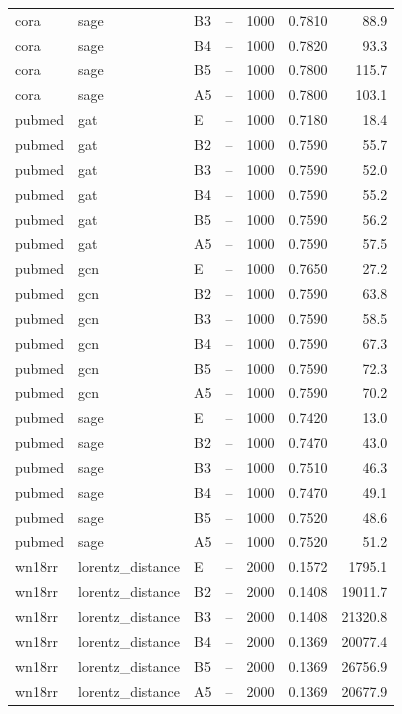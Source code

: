 \begin{longtable}{llllrrr}
cora & sage & B3 & -- & 1000 & 0.7810 & 88.9 \\
cora & sage & B4 & -- & 1000 & 0.7820 & 93.3 \\
\rowcolor{oursbg}
cora & sage & B5 & -- & 1000 & 0.7800 & 115.7 \\
cora & sage & A5 & -- & 1000 & 0.7800 & 103.1 \\
pubmed & gat & E & -- & 1000 & 0.7180 & 18.4 \\
pubmed & gat & B2 & -- & 1000 & 0.7590 & 55.7 \\
pubmed & gat & B3 & -- & 1000 & 0.7590 & 52.0 \\
pubmed & gat & B4 & -- & 1000 & 0.7590 & 55.2 \\
\rowcolor{oursbg}
pubmed & gat & B5 & -- & 1000 & 0.7590 & 56.2 \\
pubmed & gat & A5 & -- & 1000 & 0.7590 & 57.5 \\
pubmed & gcn & E & -- & 1000 & 0.7650 & 27.2 \\
pubmed & gcn & B2 & -- & 1000 & 0.7590 & 63.8 \\
pubmed & gcn & B3 & -- & 1000 & 0.7590 & 58.5 \\
pubmed & gcn & B4 & -- & 1000 & 0.7590 & 67.3 \\
\rowcolor{oursbg}
pubmed & gcn & B5 & -- & 1000 & 0.7590 & 72.3 \\
pubmed & gcn & A5 & -- & 1000 & 0.7590 & 70.2 \\
pubmed & sage & E & -- & 1000 & 0.7420 & 13.0 \\
pubmed & sage & B2 & -- & 1000 & 0.7470 & 43.0 \\
pubmed & sage & B3 & -- & 1000 & 0.7510 & 46.3 \\
pubmed & sage & B4 & -- & 1000 & 0.7470 & 49.1 \\
\rowcolor{oursbg}
pubmed & sage & B5 & -- & 1000 & 0.7520 & 48.6 \\
pubmed & sage & A5 & -- & 1000 & 0.7520 & 51.2 \\
wn18rr & lorentz\_distance & E & -- & 2000 & 0.1572 & 1795.1 \\
wn18rr & lorentz\_distance & B2 & -- & 2000 & 0.1408 & 19011.7 \\
wn18rr & lorentz\_distance & B3 & -- & 2000 & 0.1408 & 21320.8 \\
wn18rr & lorentz\_distance & B4 & -- & 2000 & 0.1369 & 20077.4 \\
\rowcolor{oursbg}
wn18rr & lorentz\_distance & B5 & -- & 2000 & 0.1369 & 26756.9 \\
wn18rr & lorentz\_distance & A5 & -- & 2000 & 0.1369 & 20677.9 \\

\end{longtable}

